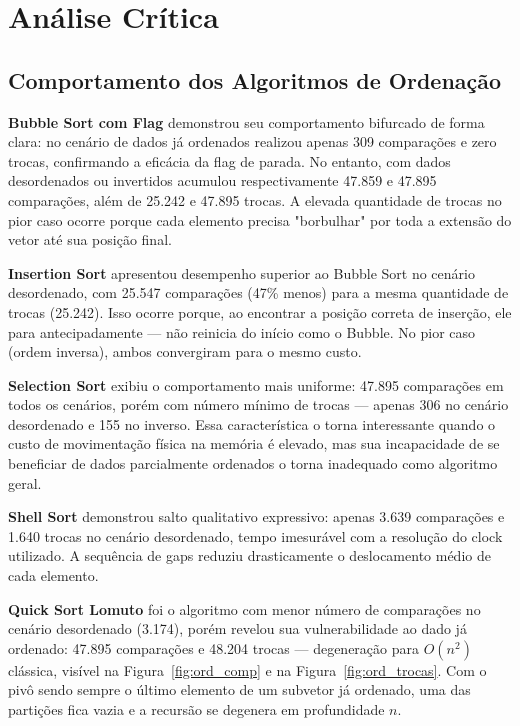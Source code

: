 \documentclass[12pt]{article}
\begin{document}
\section{Análise Crítica}
\label{sec:analise}

\subsection{Comportamento dos Algoritmos de Ordenação}

\textbf{Bubble Sort com Flag} demonstrou seu comportamento bifurcado de forma clara: no cenário de dados já ordenados realizou apenas 309 comparações e zero trocas, confirmando a eficácia da flag de parada. No entanto, com dados desordenados ou invertidos acumulou respectivamente 47.859 e 47.895 comparações, além de 25.242 e 47.895 trocas. A elevada quantidade de trocas no pior caso ocorre porque cada elemento precisa "borbulhar" por toda a extensão do vetor até sua posição final.

\textbf{Insertion Sort} apresentou desempenho superior ao Bubble Sort no cenário desordenado, com 25.547 comparações (47\% menos) para a mesma quantidade de trocas (25.242). Isso ocorre porque, ao encontrar a posição correta de inserção, ele para antecipadamente --- não reinicia do início como o Bubble. No pior caso (ordem inversa), ambos convergiram para o mesmo custo.

\textbf{Selection Sort} exibiu o comportamento mais uniforme: 47.895 comparações em todos os cenários, porém com número mínimo de trocas --- apenas 306 no cenário desordenado e 155 no inverso. Essa característica o torna interessante quando o custo de movimentação física na memória é elevado, mas sua incapacidade de se beneficiar de dados parcialmente ordenados o torna inadequado como algoritmo geral.

\textbf{Shell Sort} demonstrou salto qualitativo expressivo: apenas 3.639 comparações e 1.640 trocas no cenário desordenado, tempo imesurável com a resolução do clock utilizado. A sequência de gaps reduziu drasticamente o deslocamento médio de cada elemento.

\textbf{Quick Sort Lomuto} foi o algoritmo com menor número de comparações no cenário desordenado (3.174), porém revelou sua vulnerabilidade ao dado já ordenado: 47.895 comparações e 48.204 trocas --- degeneração para $O(n^2)$ clássica, visível na Figura~\ref{fig:ord_comp} e na Figura~\ref{fig:ord_trocas}. Com o pivô sendo sempre o último elemento de um subvetor já ordenado, uma das partições fica vazia e a recursão se degenera em profundidade $n$.
\end{document}

